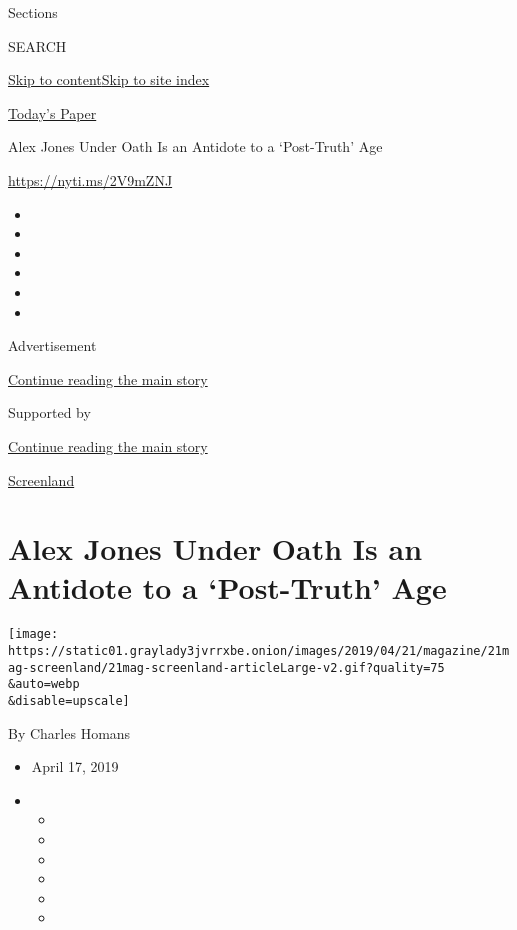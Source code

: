 Sections

SEARCH

\protect\hyperlink{site-content}{Skip to
content}\protect\hyperlink{site-index}{Skip to site index}

\href{https://myaccount.nytimes3xbfgragh.onion/auth/login?response_type=cookie\&client_id=vi}{}

\href{https://www.nytimes3xbfgragh.onion/section/todayspaper}{Today's
Paper}

Alex Jones Under Oath Is an Antidote to a `Post-Truth' Age

\url{https://nyti.ms/2V9mZNJ}

\begin{itemize}
\item
\item
\item
\item
\item
\item
\end{itemize}

Advertisement

\protect\hyperlink{after-top}{Continue reading the main story}

Supported by

\protect\hyperlink{after-sponsor}{Continue reading the main story}

\href{/column/screenland}{Screenland}

\hypertarget{alex-jones-under-oath-is-an-antidote-to-a-post-truth-age}{%
\section{Alex Jones Under Oath Is an Antidote to a `Post-Truth'
Age}\label{alex-jones-under-oath-is-an-antidote-to-a-post-truth-age}}

\texttt{[image: https://static01.graylady3jvrrxbe.onion/images/2019/04/21/magazine/21mag-screenland/21mag-screenland-articleLarge-v2.gif?quality=75\\\&auto=webp\\\&disable=upscale]}

By Charles Homans

\begin{itemize}
\item
  April 17, 2019
\item
  \begin{itemize}
  \item
  \item
  \item
  \item
  \item
  \item
  \end{itemize}
\end{itemize}

